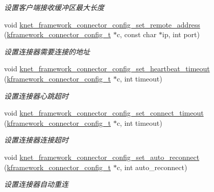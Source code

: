 \begin{DoxyCompactItemize}
\begin{DoxyCompactList}\small\item\em 设置客户端接收缓冲区最大长度 \end{DoxyCompactList}\item 
void \hyperlink{a00115_gae677441ee9bcc61da7c7728ce3ae773e_gae677441ee9bcc61da7c7728ce3ae773e}{knet\+\_\+framework\+\_\+connector\+\_\+config\+\_\+set\+\_\+remote\+\_\+address} (\hyperlink{a00056_a44d3033eba5a4fd784a741700a7a2521_a44d3033eba5a4fd784a741700a7a2521}{kframework\+\_\+connector\+\_\+config\+\_\+t} $\ast$c, const char $\ast$ip, int port)
\begin{DoxyCompactList}\small\item\em 设置连接器需要连接的地址 \end{DoxyCompactList}\item 
void \hyperlink{a00115_ga186f2fb032c5b2350e990c63b5aa628e_ga186f2fb032c5b2350e990c63b5aa628e}{knet\+\_\+framework\+\_\+connector\+\_\+config\+\_\+set\+\_\+heartbeat\+\_\+timeout} (\hyperlink{a00056_a44d3033eba5a4fd784a741700a7a2521_a44d3033eba5a4fd784a741700a7a2521}{kframework\+\_\+connector\+\_\+config\+\_\+t} $\ast$c, int timeout)
\begin{DoxyCompactList}\small\item\em 设置连接器心跳超时 \end{DoxyCompactList}\item 
void \hyperlink{a00115_gacf0d08bb6f135c12326d30acad7456f1_gacf0d08bb6f135c12326d30acad7456f1}{knet\+\_\+framework\+\_\+connector\+\_\+config\+\_\+set\+\_\+connect\+\_\+timeout} (\hyperlink{a00056_a44d3033eba5a4fd784a741700a7a2521_a44d3033eba5a4fd784a741700a7a2521}{kframework\+\_\+connector\+\_\+config\+\_\+t} $\ast$c, int timeout)
\begin{DoxyCompactList}\small\item\em 设置连接器连接超时 \end{DoxyCompactList}\item 
void \hyperlink{a00115_ga984a212938eb7d5b79fae88c5eeb1644_ga984a212938eb7d5b79fae88c5eeb1644}{knet\+\_\+framework\+\_\+connector\+\_\+config\+\_\+set\+\_\+auto\+\_\+reconnect} (\hyperlink{a00056_a44d3033eba5a4fd784a741700a7a2521_a44d3033eba5a4fd784a741700a7a2521}{kframework\+\_\+connector\+\_\+config\+\_\+t} $\ast$c, int auto\+\_\+reconnect)
\begin{DoxyCompactList}\small\item\em 设置连接器自动重连 \end{DoxyCompactList}\item 

\end{DoxyCompactItemize}
